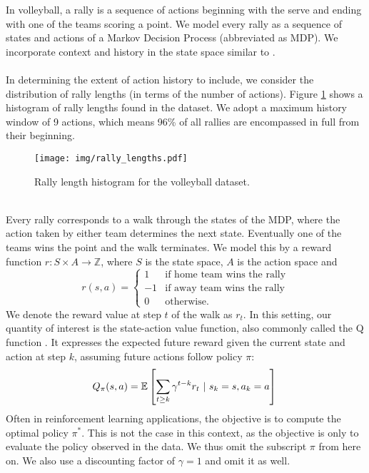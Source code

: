 \documentclass{sfuthesis}
\begin{document}
	In volleyball, a rally is a sequence of actions beginning with the serve and ending with one of the teams scoring a point. We model every rally as a sequence of states and actions of a Markov Decision Process (abbreviated as MDP). We incorporate context and history in the state space similar to \cite{schulte2017markov}.\\\\
	In determining the extent of action history to include, we consider the distribution of rally lengths (in terms of the number of actions). Figure \ref{fig:rally-lengths} shows a histogram of rally lengths found in the dataset. We adopt a maximum history window of 9 actions, which means 96\% of all rallies are encompassed in full from their beginning.\\
	\begin{figure}
		\texttt{[image: img/rally\_lengths.pdf]}
		\caption{Rally length histogram for the volleyball dataset.}
		\label{fig:rally-lengths}
	\end{figure}
	\\
	Every rally corresponds to a walk through the states of the MDP, where the action taken by either team determines the next state. Eventually one of the teams wins the point and the walk terminates. We model this by a reward function $r: S \times A \rightarrow \mathbb{Z}$, where $S$ is the state space, $A$ is the action space and
	\begin{equation}
		r(s,a) =
		\begin{cases} 
			1 & \text{if home team wins the rally} \\
			-1 & \text{if away team wins the rally} \\
			0 & \text{otherwise.} 
		\end{cases}
		\label{eq:reward_function}
	\end{equation}
	We denote the reward value at step $t$ of the walk as $r_t$. In this setting, our quantity of interest is the state-action value function, also commonly called the Q function \cite{sutton2018reinforcement}. It expresses the expected future reward given the current state and action at step $k$, assuming future actions follow policy $\pi$:
	\begin{equation}
		Q_\pi(s,a) = \mathbb{E} \left[ \sum_{t \ge k} \gamma^{t-k} r_{t} \ | \ s_k = s, a_k = a \right]\\
		\label{eq:qfunction}
	\end{equation}
	Often in reinforcement learning applications, the objective is to compute the optimal policy $\pi^*$. This is not the case in this context, as the objective is only to evaluate the policy observed in the data. We  thus omit the subscript $\pi$ from here on. We also use a discounting factor of $\gamma=1$ and omit it as well.
		
\end{document}
